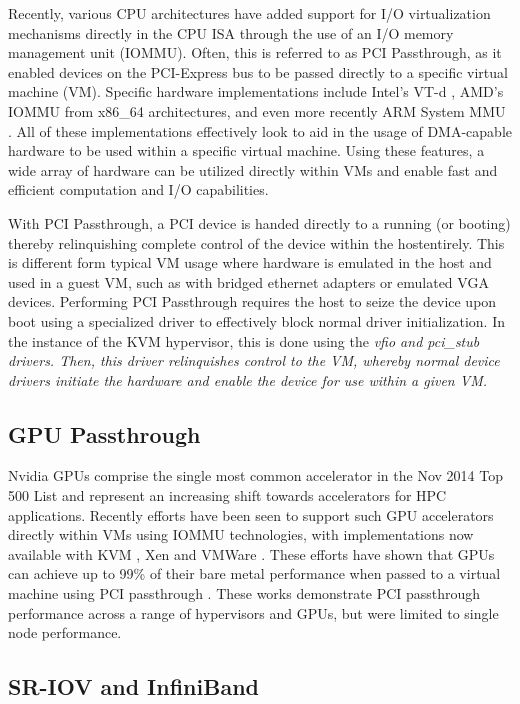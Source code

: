 \documentclass[times,10pt,twocolumn,conference]{IEEEtran}
\begin{document}
Recently, various CPU architectures have added support for I/O virtualization mechanisms directly in the CPU ISA through the use of an I/O memory management unit (IOMMU). Often, this is referred to as PCI Passthrough, as it enabled devices on the PCI-Express bus to be passed directly to a specific virtual machine (VM).  Specific hardware implementations include Intel's VT-d \cite{intel-vtd}, AMD's IOMMU \cite{amdiommu} from x86\_64 architectures, and even more recently ARM System MMU \cite{arm-systemmmu}.  All of these implementations effectively look to aid in the usage of DMA-capable hardware to be used within a specific virtual machine. Using these features, a wide array of hardware can be utilized directly within VMs and enable fast and efficient computation and I/O capabilities.

With PCI Passthrough, a PCI device is handed directly to a running (or booting) thereby relinquishing complete control of the device within the hostentirely. This is different form typical VM usage where hardware is emulated in the host and used in a guest VM, such as with bridged ethernet adapters or emulated VGA devices. Performing PCI Passthrough requires the host to seize the device upon boot using a specialized driver to effectively block normal driver initialization. In the instance of the KVM hypervisor, this is done using the \em{vfio} and \em{pci\_stub} drivers. Then, this driver relinquishes control to the VM, whereby normal device drivers initiate the hardware and enable the device for use within a given VM.  

\subsection{GPU Passthrough}

Nvidia GPUs comprise the single most common accelerator in the Nov 2014 Top 500
List \cite{top500} and represent an increasing shift towards accelerators for
HPC applications. Recently efforts have been seen to support such GPU
accelerators directly within VMs using IOMMU technologies, with implementations
now available with KVM \cite{Walters2014cloud}, Xen \cite{Younge2013hpgc} and VMWare \cite{Vu2014}.  These efforts have shown that GPUs can achieve up to 99\% of their bare metal performance when passed to a virtual machine using PCI passthrough \cite{Walters2014cloud}.  These works demonstrate PCI passthrough performance across a range of hypervisors and GPUs, but were limited to single node performance. 

\subsection{SR-IOV and InfiniBand}
\end{document}

